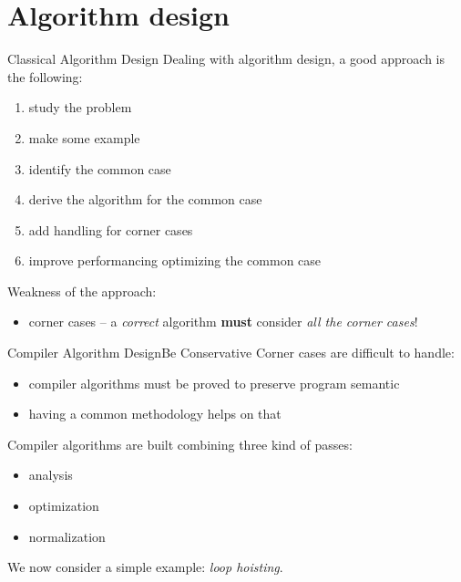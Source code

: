 \documentclass[10pt,mathserif]{beamer}
\begin{document}
\section{Algorithm design}
\begin{frame}{Classical Algorithm Design}
Dealing with algorithm design, a good approach is the following:
\begin{enumerate}
\item study the problem
\item make some example
\item identify the \alert{common case}
\item derive the algorithm for the common case
\item add handling for \alert{corner cases}
\item improve performancing \alert{optimizing the common case}
\end{enumerate}

\vfill
Weakness of the approach:
\begin{itemize}
\item \alert{corner cases} -- a \emph{correct} algorithm \textbf{must} consider \emph{all the corner cases}!
\end{itemize}
\end{frame}

\begin{frame}{Compiler Algorithm Design}{Be Conservative}
Corner cases are difficult to handle:

\begin{itemize}
\item compiler algorithms must be \alert{proved} to preserve program semantic
\item having a common methodology helps on that
\end{itemize}
\vfill
Compiler algorithms are built combining three kind of \alert{passes}:

\begin{itemize}
\item analysis
\item optimization
\item normalization
\end{itemize}

\vfill
We now consider a simple example: \emph{loop hoisting}.
\end{frame}
\end{document}
